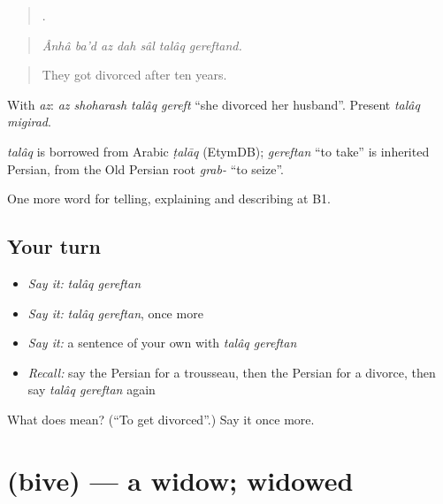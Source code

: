 \begin{quote}
      .
\end{quote}

\begin{quote}
\emph{Ânhâ ba'd az dah sâl talâq gereftand.}
\end{quote}

\begin{quote}
They got divorced after ten years.
\end{quote}

With \emph{az}: \emph{az shoharash talâq gereft} \textquotedblleft{}she divorced her husband\textquotedblright{}. Present \emph{talâq migirad}.

\begin{cousinweb}
\emph{talâq} is borrowed from Arabic \emph{ṭalāq} (EtymDB); \emph{gereftan} \textquotedblleft{}to take\textquotedblright{} is inherited Persian, from the Old Persian root \emph{grab-} \textquotedblleft{}to seize\textquotedblright{}.
\end{cousinweb}

\begin{grammarlens}[title={What you've built}]
One more word for telling, explaining and describing at B1.
\end{grammarlens}

\subsection*{Your turn}
\begin{itemize}
\raggedright
  \item \emph{Say it:} \emph{talâq gereftan}
  \item \emph{Say it:} \emph{talâq gereftan}, once more
  \item \emph{Say it:} a sentence of your own with \emph{talâq gereftan}
  \item \emph{Recall:} say the Persian for a trousseau, then the Persian for a divorce, then say \emph{talâq gereftan} again
\end{itemize}

\begin{tcolorbox}[breakable,colback=teal!4,colframe=teal!35!black,title={Before you move on}]
What does   mean? (\textquotedblleft{}To get divorced\textquotedblright{}.) Say it once more.
\end{tcolorbox}
\section[\texorpdfstring{\fa{بیوه} (bive)}{بیوه (bive)}]{ (bive) — a widow; widowed}

